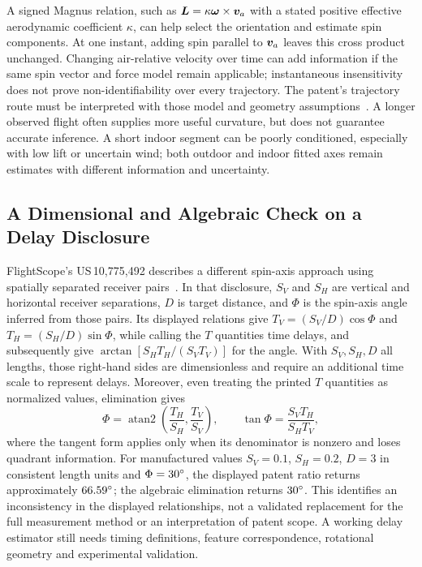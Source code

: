 A signed Magnus relation, such as $\bm{L}=\kappa\bm{\omega}\times\bm{v}_a$ with a stated positive effective aerodynamic coefficient $\kappa$, can help select the orientation and estimate spin components.
At one instant, adding spin parallel to $\bm{v}_a$ leaves this cross product unchanged.
Changing air-relative velocity over time can add information if the same spin vector and force model remain applicable; instantaneous insensitivity does not prove non-identifiability over every trajectory.
The patent's trajectory route must be interpreted with those model and geometry assumptions~\cite{us8845442}.
A longer observed flight often supplies more useful curvature, but does not guarantee accurate inference.
A short indoor segment can be poorly conditioned, especially with low lift or uncertain wind; both outdoor and indoor fitted axes remain estimates with different information and uncertainty.

\subsection{A Dimensional and Algebraic Check on a Delay Disclosure}

FlightScope's US\,10,775,492 describes a different spin-axis approach using spatially separated receiver pairs~\cite{us10775492}.
In that disclosure, $S_V$ and $S_H$ are vertical and horizontal receiver separations, $D$ is target distance, and $\Phi$ is the spin-axis angle inferred from those pairs.
Its displayed relations give $T_V=(S_V/D)\cos\Phi$ and $T_H=(S_H/D)\sin\Phi$, while calling the $T$ quantities time delays, and subsequently give $\arctan[S_HT_H/(S_VT_V)]$ for the angle.
With $S_V,S_H,D$ all lengths, those right-hand sides are dimensionless and require an additional time scale to represent delays.
Moreover, even treating the printed $T$ quantities as normalized values, elimination gives
\begin{equation}
\label{eq:radardelaycheck}
\Phi=\operatorname{atan2}\!\left(\frac{T_H}{S_H},\frac{T_V}{S_V}\right),
\qquad
\tan\Phi=\frac{S_VT_H}{S_HT_V},
\end{equation}
where the tangent form applies only when its denominator is nonzero and loses quadrant information.
For manufactured values $S_V=0.1$, $S_H=0.2$, $D=3$ in consistent length units and $\Phi=30\si{\degree}$, the displayed patent ratio returns approximately $66.59\si{\degree}$; the algebraic elimination returns $30\si{\degree}$.
This identifies an inconsistency in the displayed relationships, not a validated replacement for the full measurement method or an interpretation of patent scope.
A working delay estimator still needs timing definitions, feature correspondence, rotational geometry and experimental validation.

